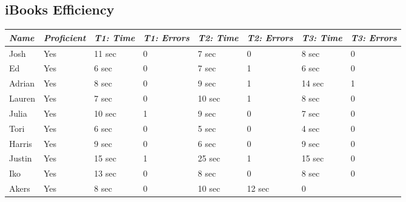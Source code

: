 \documentclass[journal,letterpaper]{article}
\begin{document}
    \subsection{iBooks Efficiency}
    \begin{center}
        \centering
        \begin{tabular}{|l|l|l|l|l|l|l|l|}
            \hline
            \emph{Name} & \emph{Proficient} & \emph{T1: Time} & \emph{T1: Errors} & \emph{T2: Time} & \emph{T2: Errors} & \emph{T3: Time} & \emph{T3: Errors} \\
            \hline
            Josh & Yes & 11 sec & 0 & 7 sec & 0 & 8 sec & 0 \\
            \hline
            Ed & Yes & 6 sec & 0 & 7 sec & 1 & 6 sec & 0 \\
            \hline
            Adrian & Yes & 8 sec & 0 & 9 sec & 1 & 14 sec & 1 \\
            \hline
            Lauren & Yes & 7 sec & 0 & 10 sec & 1 & 8 sec & 0 \\
            \hline
            Julia & Yes & 10 sec & 1 & 9 sec & 0 & 7 sec & 0 \\
            \hline
            Tori & Yes & 6 sec & 0 & 5 sec & 0 & 4 sec & 0 \\
            \hline
            Harris & Yes & 9 sec & 0 & 6 sec & 0 & 9 sec & 0 \\
            \hline
            Justin & Yes & 15 sec & 1 & 25 sec & 1 & 15 sec & 0 \\
            \hline
            Iko & Yes & 13 sec & 0 & 8 sec & 0 & 8 sec & 0 \\
            \hline
            Akers & Yes & 8 sec & 0 & 10 sec & 12 sec & 0 \\
        \end{tabular}
    \end{center}
\end{document}
